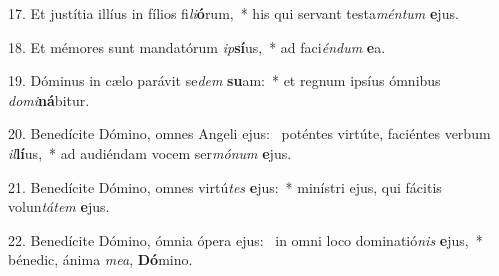 17. Et justítia illíus in fílios fi\textit{li}\textbf{ó}rum,~*  his qui servant testa\textit{mén}\textit{tum} \textbf{e}jus.\

18. Et mémores sunt mandatórum \textit{ip}\textbf{sí}us,~*  ad faci\textit{én}\textit{dum} \textbf{e}a.\

19. Dóminus in cælo parávit se\textit{dem} \textbf{su}am:~*  et regnum ipsíus ómnibus \textit{do}\textit{mi}\textbf{ná}bitur.\

20. Benedícite Dómino, omnes Angeli ejus: \dag\  poténtes virtúte, faciéntes verbum \textit{il}\textbf{lí}us,~*  ad audiéndam vocem ser\textit{mó}\textit{num} \textbf{e}jus.\

21. Benedícite Dómino, omnes virtú\textit{tes} \textbf{e}jus:~*  minístri ejus, qui fácitis volun\textit{tá}\textit{tem} \textbf{e}jus.\

22. Benedícite Dómino, ómnia ópera ejus: \dag\  in omni loco dominatió\textit{nis} \textbf{e}jus,~*  bénedic, ánima \textit{me}\textit{a}, \textbf{Dó}mino.\

